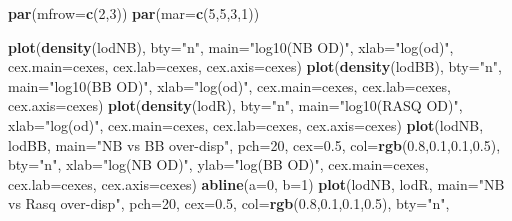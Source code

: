 \documentclass[]{article}
\newenvironment{Shaded}{\begin{snugshade}}{\end{snugshade}}
\newcommand{\KeywordTok}[1]{\textcolor[rgb]{0.13,0.29,0.53}{\textbf{#1}}}
\newcommand{\DataTypeTok}[1]{\textcolor[rgb]{0.13,0.29,0.53}{#1}}
\newcommand{\DecValTok}[1]{\textcolor[rgb]{0.00,0.00,0.81}{#1}}
\newcommand{\FloatTok}[1]{\textcolor[rgb]{0.00,0.00,0.81}{#1}}
\newcommand{\StringTok}[1]{\textcolor[rgb]{0.31,0.60,0.02}{#1}}
\newcommand{\NormalTok}[1]{#1}
\begin{document}
\begin{Shaded}
\begin{Highlighting}[]
\KeywordTok{par}\NormalTok{(}\DataTypeTok{mfrow=}\KeywordTok{c}\NormalTok{(}\DecValTok{2}\NormalTok{,}\DecValTok{3}\NormalTok{))}
\KeywordTok{par}\NormalTok{(}\DataTypeTok{mar=}\KeywordTok{c}\NormalTok{(}\DecValTok{5}\NormalTok{,}\DecValTok{5}\NormalTok{,}\DecValTok{3}\NormalTok{,}\DecValTok{1}\NormalTok{))}

\KeywordTok{plot}\NormalTok{(}\KeywordTok{density}\NormalTok{(lodNB), }\DataTypeTok{bty=}\StringTok{"n"}\NormalTok{, }\DataTypeTok{main=}\StringTok{"log10(NB OD)"}\NormalTok{, }
     \DataTypeTok{xlab=}\StringTok{"log(od)"}\NormalTok{, }\DataTypeTok{cex.main=}\NormalTok{cexes, }\DataTypeTok{cex.lab=}\NormalTok{cexes, }\DataTypeTok{cex.axis=}\NormalTok{cexes)}
\KeywordTok{plot}\NormalTok{(}\KeywordTok{density}\NormalTok{(lodBB), }\DataTypeTok{bty=}\StringTok{"n"}\NormalTok{, }\DataTypeTok{main=}\StringTok{"log10(BB OD)"}\NormalTok{, }
     \DataTypeTok{xlab=}\StringTok{"log(od)"}\NormalTok{, }\DataTypeTok{cex.main=}\NormalTok{cexes, }\DataTypeTok{cex.lab=}\NormalTok{cexes, }\DataTypeTok{cex.axis=}\NormalTok{cexes)}
\KeywordTok{plot}\NormalTok{(}\KeywordTok{density}\NormalTok{(lodR), }\DataTypeTok{bty=}\StringTok{"n"}\NormalTok{, }\DataTypeTok{main=}\StringTok{"log10(RASQ OD)"}\NormalTok{,}
     \DataTypeTok{xlab=}\StringTok{"log(od)"}\NormalTok{, }\DataTypeTok{cex.main=}\NormalTok{cexes, }\DataTypeTok{cex.lab=}\NormalTok{cexes, }\DataTypeTok{cex.axis=}\NormalTok{cexes)}
\KeywordTok{plot}\NormalTok{(lodNB, lodBB, }\DataTypeTok{main=}\StringTok{"NB vs BB over-disp"}\NormalTok{, }\DataTypeTok{pch=}\DecValTok{20}\NormalTok{, }\DataTypeTok{cex=}\FloatTok{0.5}\NormalTok{, }\DataTypeTok{col=}\KeywordTok{rgb}\NormalTok{(}\FloatTok{0.8}\NormalTok{,}\FloatTok{0.1}\NormalTok{,}\FloatTok{0.1}\NormalTok{,}\FloatTok{0.5}\NormalTok{), }\DataTypeTok{bty=}\StringTok{"n"}\NormalTok{,}
     \DataTypeTok{xlab=}\StringTok{"log(NB OD)"}\NormalTok{, }\DataTypeTok{ylab=}\StringTok{"log(BB OD)"}\NormalTok{, }\DataTypeTok{cex.main=}\NormalTok{cexes, }\DataTypeTok{cex.lab=}\NormalTok{cexes, }\DataTypeTok{cex.axis=}\NormalTok{cexes)}
\KeywordTok{abline}\NormalTok{(}\DataTypeTok{a=}\DecValTok{0}\NormalTok{, }\DataTypeTok{b=}\DecValTok{1}\NormalTok{)}
\KeywordTok{plot}\NormalTok{(lodNB, lodR, }\DataTypeTok{main=}\StringTok{"NB vs Rasq over-disp"}\NormalTok{, }\DataTypeTok{pch=}\DecValTok{20}\NormalTok{, }\DataTypeTok{cex=}\FloatTok{0.5}\NormalTok{, }\DataTypeTok{col=}\KeywordTok{rgb}\NormalTok{(}\FloatTok{0.8}\NormalTok{,}\FloatTok{0.1}\NormalTok{,}\FloatTok{0.1}\NormalTok{,}\FloatTok{0.5}\NormalTok{), }\DataTypeTok{bty=}\StringTok{"n"}\NormalTok{,}

\end{Highlighting}
\end{Shaded}
\end{document}
